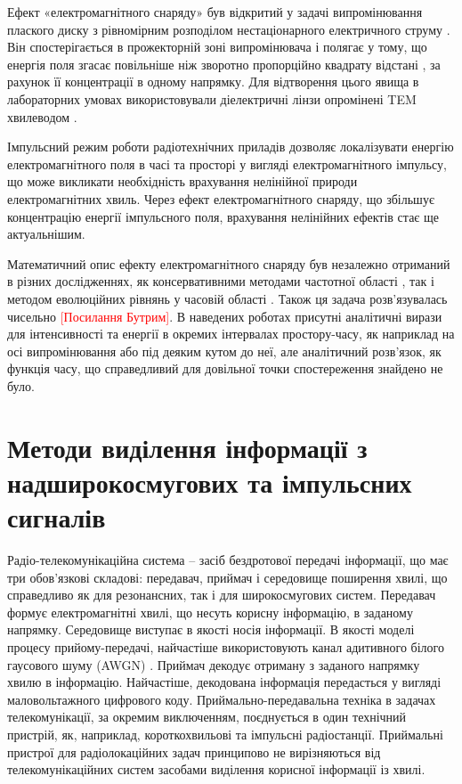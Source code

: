 Ефект «електромагнітного снаряду» був відкритий у задачі випромінювання 
плаского диску з рівномірним розподілом нестаціонарного електричного струму 
\cite{imp:Wu1985}. Він спостерігається в прожекторній зоні випромінювача і 
полягає у тому, що енергія поля згасає повільніше ніж зворотно пропорційно 
квадрату відстані \cite{imp:Sodin1992-10}, за рахунок її концентрації в 
одному напрямку. Для відтворення цього явища в лабораторних умовах 
використовували діелектричні лінзи опромінені TEM хвилеводом \cite{imp:Wu1991}.

Імпульсний режим роботи радіотехнічних приладів дозволяє локалізувати енергію 
електромагнітного поля в часі та просторі у вигляді електромагнітного 
імпульсу, що може викликати необхідність врахування нелінійної природи 
електромагнітних хвиль. Через ефект електромагнітного снаряду, що збільшує 
концентрацію енергії імпульсного поля, врахування нелінійних ефектів стає 
ще актуальнішим.

Математичний опис ефекту електромагнітного снаряду був незалежно отриманий 
в різних дослідженнях, як консервативними методами частотної області
\cite{imp:Wu1987, imp:Samsonov1986}, так і методом еволюційних рівнянь у 
часовій області \cite{imp:Dumin1996}. Також ця задача розв'язувалась 
чисельно \textcolor{red}{[Посилання Бутрим]}. В наведених роботах присутні
аналітичні вирази для інтенсивності та енергії в окремих інтервалах 
простору-часу, як наприклад на осі випромінювання або під деяким кутом до 
неї, але аналітичний розв'язок, як функція часу, що справедливий для 
довільної точки спостереження знайдено не було.

\section{Методи виділення інформації з надширокосмугових та імпульсних сигналів}

Радіо-телекомунікаційна система -- засіб бездротової передачі інформації, що 
має три обов'язкові складові: передавач, приймач і середовище поширення 
хвилі, що справедливо як для резонансних, так і для широкосмугових систем. 
Передавач формує електромагнітні хвилі,  що несуть корисну інформацію, в заданому 
напрямку. Середовище виступає в якості носія інформації. В якості моделі процесу 
прийому-передачі, найчастіше використовують канал адитивного білого гаусового 
шуму (AWGN) \cite{imp:Lazorenko2009}. Приймач декодує отриману з заданого 
напрямку хвилю в інформацію. Найчастіше, декодована інформація передасться 
у вигляді маловольтажного цифрового коду. Приймально-передавальна техніка в 
задачах телекомунікації, за окремим виключенням, поєднується в один технічний 
пристрій, як, наприклад, короткохвильові та імпульсні радіостанції. Приймальні 
пристрої для радіолокаційних задач принципово не вирізняються від 
телекомунікаційних систем засобами виділення корисної інформації із хвилі.

